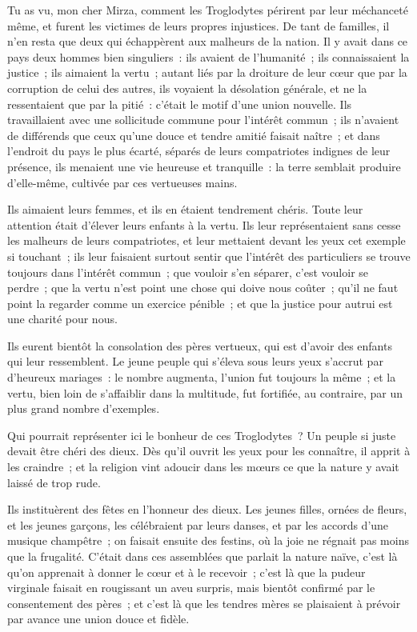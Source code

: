 \documentclass[french,twoside]{book} %
\begin{document}
\noindent Tu as vu, mon cher Mirza, comment les Troglodytes périrent par leur méchanceté même, et furent les victimes de leurs propres injustices. De tant de familles, il n’en resta que deux qui échappèrent aux malheurs de la nation. Il y avait dans ce pays deux hommes bien singuliers : ils avaient de l’humanité ; ils connaissaient la justice ; ils aimaient la vertu ; autant liés par la droiture de leur cœur que par la corruption de celui des autres, ils voyaient la désolation générale, et ne la ressentaient que par la pitié : c’était le motif d’une union nouvelle. Ils travaillaient avec une sollicitude commune pour l’intérêt commun ; ils n’avaient de différends que ceux qu’une douce et tendre amitié faisait naître ; et dans l’endroit du pays le plus écarté, séparés de leurs compatriotes indignes de leur présence, ils menaient une vie heureuse et tranquille : la terre semblait produire d’elle-même, cultivée par ces vertueuses mains.\par
Ils aimaient leurs femmes, et ils en étaient tendrement chéris. Toute leur attention était d’élever leurs enfants à la vertu. Ils leur représentaient sans cesse les malheurs de leurs compatriotes, et leur mettaient devant les yeux cet exemple si touchant ; ils leur faisaient surtout sentir que l’intérêt des particuliers se trouve toujours dans l’intérêt commun ; que vouloir s’en séparer, c’est vouloir se perdre ; que la vertu n’est point une chose qui doive nous coûter ; qu’il ne faut point la regarder comme un exercice pénible ; et que la justice pour autrui est une charité pour nous.\par
Ils eurent bientôt la consolation des pères vertueux, qui est d’avoir des enfants qui leur ressemblent. Le jeune peuple qui s’éleva sous leurs yeux s’accrut par d’heureux mariages : le nombre augmenta, l’union fut toujours la même ; et la vertu, bien loin de s’affaiblir dans la multitude, fut fortifiée, au contraire, par un plus grand nombre d’exemples.\par
Qui pourrait représenter ici le bonheur de ces Troglodytes ? Un peuple si juste devait être chéri des dieux. Dès qu’il ouvrit les yeux pour les connaître, il apprit à les craindre ; et la religion vint adoucir dans les mœurs ce que la nature y avait laissé de trop rude.\par
Ils instituèrent des fêtes en l’honneur des dieux. Les jeunes filles, ornées de fleurs, et les jeunes garçons, les célébraient par leurs danses, et par les accords d’une musique champêtre ; on faisait ensuite des festins, où la joie ne régnait pas moins que la frugalité. C’était dans ces assemblées que parlait la nature naïve, c’est là qu’on apprenait à donner le cœur et à le recevoir ; c’est là que la pudeur virginale faisait en rougissant un aveu surpris, mais bientôt confirmé par le consentement des pères ; et c’est là que les tendres mères se plaisaient à prévoir par avance une union douce et fidèle.\par
\end{document}
